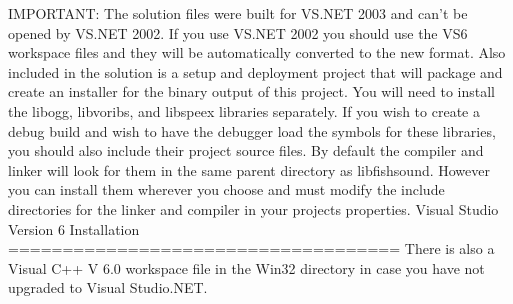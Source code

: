 \begin{DoxyCodeInclude}
IMPORTANT: The solution files were built \textcolor{keywordflow}{for} VS.NET 2003 and can\textcolor{stringliteral}{'t be}
\textcolor{stringliteral}{opened by VS.NET 2002. If you use VS.NET 2002 you should use the VS6}
\textcolor{stringliteral}{workspace files and they will be automatically converted to the new}
\textcolor{stringliteral}{format.}
\textcolor{stringliteral}{}
\textcolor{stringliteral}{Also included in the solution is a setup and deployment project that}
\textcolor{stringliteral}{will package and create an installer for the binary output of this}
\textcolor{stringliteral}{project.}
\textcolor{stringliteral}{}
\textcolor{stringliteral}{You will need to install the libogg, libvoribs, and libspeex libraries}
\textcolor{stringliteral}{separately. If you wish to create a debug build and wish to have the}
\textcolor{stringliteral}{debugger load the symbols for these libraries, you should also include}
\textcolor{stringliteral}{their project source files. By default the compiler and linker will}
\textcolor{stringliteral}{look for them in the same parent directory as libfishsound. However}
\textcolor{stringliteral}{you can install them wherever you choose and must modify the include}
\textcolor{stringliteral}{directories for the linker and compiler in your projects properties.}
\textcolor{stringliteral}{}
\textcolor{stringliteral}{}
\textcolor{stringliteral}{Visual Studio Version 6 Installation}
\textcolor{stringliteral}{====================================}
\textcolor{stringliteral}{}
\textcolor{stringliteral}{There is also a Visual C++ V 6.0 workspace file in the Win32 directory}
\textcolor{stringliteral}{in case you have not upgraded to Visual Studio.NET.}
\end{DoxyCodeInclude}
 